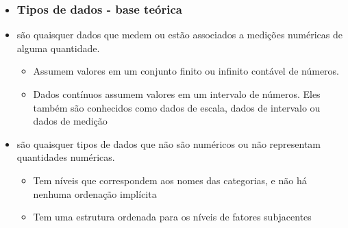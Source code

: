 \documentclass[a4paper,11pt]{article}
\begin{document}
\begin{itemize}
\item[]

\subsubsection*{Tipos de dados - base teórica} 

\item {} são quaisquer dados que medem ou estão associados a medições numéricas de alguma quantidade.
    \begin{itemize}
        \item {} Assumem valores em um conjunto finito ou infinito contável de números.
        \item {} Dados contínuos assumem valores em um intervalo de números. Eles também são conhecidos como dados de escala, dados de intervalo ou dados de medição
    \end{itemize}
    \item {} são quaisquer tipos de dados que não são numéricos ou não representam quantidades numéricas.
    \begin{itemize}
        \item {} Tem níveis que correspondem aos nomes das categorias, e não há nenhuma ordenação implícita
        \item {} Tem uma estrutura ordenada para os níveis de fatores subjacentes
    \end{itemize}

    
\end{itemize}
\end{document}

